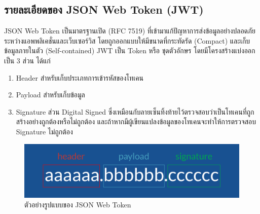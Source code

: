 	\subsection{รายละเอียดของ JSON Web Token (JWT) }
		JSON Web Token เป็นมาตรฐานเปิด (RFC 7519) ที่เข้ามาแก้ปัญหาการส่งข้อมูลอย่างปลอดภัยระหว่างแอพพลิเคชั่นและเว็บเซอร์วิส โดยถูกออกแบบให้มีขนาดที่กระทัดรัด (Compact) และเก็บข้อมูลภายในตัว (Self-contained) JWT เป็น Token หรือ ชุดตัวอักษร โดยมีโครงสร้างแบ่งออกเป็น 3 ส่วน ได้แก่
		\begin{enumerate}
			\item Header สำหรับเก็บประเภทการเข้ารหัสของโทเคน 
			\item Payload สำหรับเก็บข้อมูล
			\item Signature ส่วน Digital Signed ซึ่งเหมือนกับลายเซ็นทิ้งท้ายไว้ตรวจสอบว่าเป็นโทเคนที่ถูกสร้างอย่างถูกต้องหรือไม่ถูกต้อง และถ้าหากมีผู้เขียนแปลงข้อมูลของโทเคนจะทำให้การตรวจสอบ Signature ไม่ถูกต้อง 
		\end{enumerate}
		\begin{figure}
			\includegraphics[width=\columnwidth]{Figures/2/JWT-structure}
			\caption{ตัวอย่างรูปแบบของ JSON Web Token}
			\label{fig:JWT-structure}
		\end{figure}

